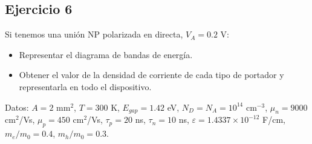 
\subsection*{Ejercicio 6} 
\begin{Enunciado}
    

Si tenemos una unión NP polarizada en directa, $V_A = 0.2$ V:

\begin{itemize}
    \item Representar el diagrama de bandas de energía.
    \item Obtener el valor de la densidad de corriente de cada tipo de portador y representarla en todo el dispositivo.
\end{itemize}

Datos: $A = 2$ mm$^2$, $T = 300$ K, $E_{gap} = 1.42$ eV, $N_D = N_A = 10^{14}$ cm$^{-3}$, $\mu_n = 9000$ cm$^2$/Vs, $\mu_p = 450$ cm$^2$/Vs, $\tau_p = 20$ ns, $\tau_n = 10$ ns, $\varepsilon = 1.4337 \times 10^{-12}$ F/cm, $m_e/m_0 = 0.4$, $m_h/m_0 = 0.3$.


\end{Enunciado}

